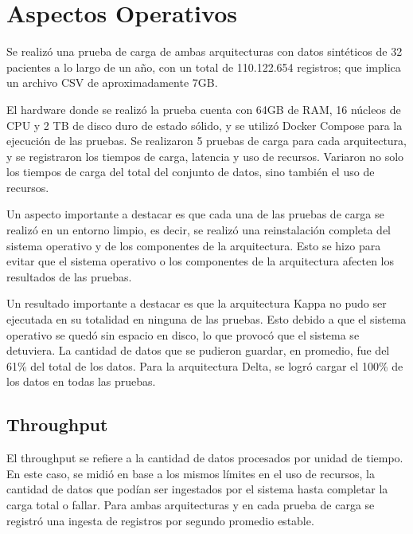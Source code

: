 \section{Aspectos Operativos}

Se realizó una prueba de carga de ambas arquitecturas con datos sintéticos de 32 pacientes a lo largo de un año, con un total de 110.122.654 registros; 
que implica un archivo CSV de aproximadamente 7GB.\newline

El hardware donde se realizó la prueba cuenta con 64GB de RAM, 16 núcleos de CPU y 2 TB de disco duro de estado sólido, y se utilizó Docker Compose para la ejecución de las pruebas.
Se realizaron 5 pruebas de carga para cada arquitectura, y se registraron los tiempos de carga, latencia y uso de recursos.
Variaron no solo los tiempos de carga del total del conjunto de datos, sino también el uso de recursos.\newline

Un aspecto importante a destacar es que cada una de las pruebas de carga se realizó en un entorno limpio, 
es decir, se realizó una reinstalación completa del sistema operativo y de los componentes de la arquitectura.
Esto se hizo para evitar que el sistema operativo o los componentes de la arquitectura afecten los resultados de las pruebas.\newline

Un resultado importante a destacar es que la arquitectura Kappa no pudo ser ejecutada en su totalidad en ninguna de las pruebas. 
Esto debido a que el sistema operativo se quedó sin espacio en disco, lo que provocó que el sistema se detuviera.
La cantidad de datos que se pudieron guardar, en promedio, fue del 61\% del total de los datos.
Para la arquitectura Delta, se logró cargar el 100\% de los datos en todas las pruebas.

\newpage

\subsection{Throughput}
El throughput se refiere a la cantidad de datos procesados por unidad de tiempo.
En este caso, se midió en base a los mismos límites en el uso de recursos, la cantidad de datos que podían ser ingestados por el sistema hasta completar la carga total o fallar.
Para ambas arquitecturas y en cada prueba de carga se registró una ingesta de registros por segundo promedio estable.\newline
  

